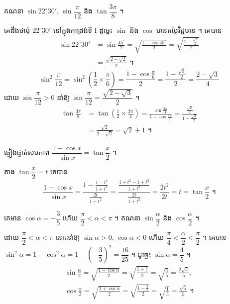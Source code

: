 \begin{example}[ឧទាហរណ៍ ១០]
គណនា $\sin 22^\circ 30'$, $\sin\dfrac{\pi}{12}$ និង $\tan\dfrac{3\pi}{8}$ ។

គេដឹងថាមុំ $22^\circ 30'$ នៅក្នុងកាដ្រង់ទី I ដូច្នេះ $\sin$ និង $\cos$ មានតម្លៃវិជ្ជមាន ។ គេបាន
\[
\begin{aligned}
\sin 22^\circ 30' &= \sin\frac{45^\circ}{2} = \sqrt{\frac{1 - \cos 45^\circ}{2}} = \sqrt{\frac{1 - \frac{\sqrt{2}}{2}}{2}}\\
&= \frac{\sqrt{2 - \sqrt{2}}}{2} \text{ ។}
\end{aligned}
\]
\[ \sin^2\frac{\pi}{12} = \sin^2\left(\frac{1}{2} \times \frac{\pi}{6}\right) = \frac{1 - \cos\frac{\pi}{6}}{2} = \frac{1 - \frac{\sqrt{3}}{2}}{2} = \frac{2 - \sqrt{3}}{4} \]
ដោយ $\sin\dfrac{\pi}{12} > 0$ នាំឱ្យ $\sin\dfrac{\pi}{12} = \dfrac{\sqrt{2 - \sqrt{3}}}{2}$ ។
\[
\begin{aligned}
\tan\frac{3\pi}{8} &= \tan\left(\frac{1}{2} \times \frac{3\pi}{4}\right) = \frac{\sin\frac{3\pi}{4}}{1 + \cos\frac{3\pi}{4}} = \frac{\frac{\sqrt{2}}{2}}{1 - \frac{\sqrt{2}}{2}}\\
&= \frac{\sqrt{2}}{2 - \sqrt{2}} = \sqrt{2} + 1 \text{ ។}
\end{aligned}
\]
\end{example}

\begin{example}[ឧទាហរណ៍ ១១]
ផ្ទៀងផ្ទាត់សមភាព $\dfrac{1 - \cos x}{\sin x} = \tan\dfrac{x}{2}$ ។

តាង $\tan\dfrac{x}{2} = t$ គេបាន
\[ \frac{1 - \cos x}{\sin x} = \frac{1 - \frac{1 - t^2}{1 + t^2}}{\frac{2t}{1 + t^2}} = \frac{\frac{1 + t^2 - 1 + t^2}{1 + t^2}}{\frac{2t}{1 + t^2}} = \frac{2t^2}{2t} = t = \tan\frac{x}{2} \text{ ។} \]
\end{example}

\begin{example}[លំហាត់គំរូ ៦]
គេមាន $\cos\alpha = -\dfrac{3}{5}$ ហើយ $\dfrac{\pi}{2} < \alpha < \pi$ ។ គណនា $\sin\dfrac{\alpha}{2}$ និង $\cos\dfrac{\alpha}{2}$ ។
\end{example}
\ans
ដោយ $\dfrac{\pi}{2} < \alpha < \pi$ នោះនាំឱ្យ $\sin\alpha > 0$, $\cos\alpha < 0$ ហើយ $\dfrac{\pi}{4} < \dfrac{\alpha}{2} < \dfrac{\pi}{2}$ ។ គេបាន $\sin^2\alpha = 1 - \cos^2\alpha = 1 - \left(-\dfrac{3}{5}\right)^2 = \dfrac{16}{25}$ ។ ដូច្នេះ $\sin\alpha = \dfrac{4}{5}$ ។
\[
\begin{gathered}
\sin\frac{\alpha}{2} = \sqrt{\frac{1 - \cos\alpha}{2}} = \sqrt{\frac{1 + \frac{3}{5}}{2}} = \sqrt{\frac{4}{5}} = \frac{2\sqrt{5}}{5},\\
\cos\frac{\alpha}{2} = \sqrt{\frac{1 + \cos\alpha}{2}} = \sqrt{\frac{1 - \frac{3}{5}}{2}} = \sqrt{\frac{1}{5}} = \frac{\sqrt{5}}{5} \text{ ។}
\end{gathered}
\]

